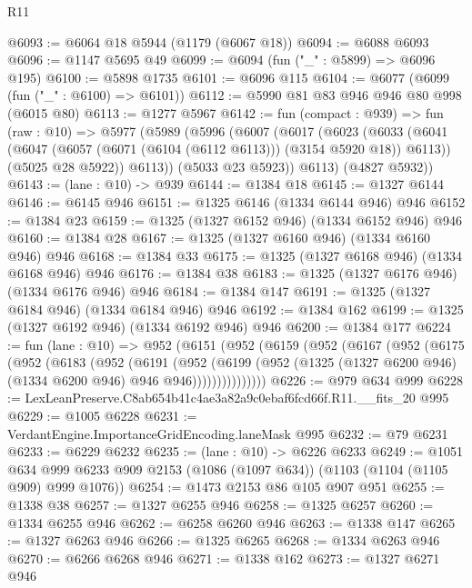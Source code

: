 \begin{lexlean}{R11}
\begin{coremodule}
@6093 := @6064 @18 @5944 (@1179 (@6067 @18))
@6094 := @6088 @6093
@6096 := @1147 @5695 @49
@6099 := @6094 (fun ("_" : @5899) => @6096 @195)
@6100 := @5898 @1735
@6101 := @6096 @115
@6104 := @6077 (@6099 (fun ("_" : @6100) => @6101))
@6112 := @5990 @81 @83 @946 @946 @80 @998 (@6015 @80)
@6113 := @1277 @5967
@6142 := fun (compact : @939) =>
  fun (raw : @10) =>
  @5977
    (@5989
      (@5996
        (@6007
          (@6017
            (@6023
              (@6033
                (@6041 (@6047 (@6057 (@6071 (@6104 (@6112 @6113))) (@3154 @5920 @18)) @6113))
                (@5025 @28 @5922))
              @6113))
          (@5033 @23 @5923))
        @6113)
      (@4827 @5932))
@6143 := (lane : @10) -> @939
@6144 := @1384 @18
@6145 := @1327 @6144
@6146 := @6145 @946
@6151 := @1325 @6146 (@1334 @6144 @946) @946
@6152 := @1384 @23
@6159 := @1325 (@1327 @6152 @946) (@1334 @6152 @946) @946
@6160 := @1384 @28
@6167 := @1325 (@1327 @6160 @946) (@1334 @6160 @946) @946
@6168 := @1384 @33
@6175 := @1325 (@1327 @6168 @946) (@1334 @6168 @946) @946
@6176 := @1384 @38
@6183 := @1325 (@1327 @6176 @946) (@1334 @6176 @946) @946
@6184 := @1384 @147
@6191 := @1325 (@1327 @6184 @946) (@1334 @6184 @946) @946
@6192 := @1384 @162
@6199 := @1325 (@1327 @6192 @946) (@1334 @6192 @946) @946
@6200 := @1384 @177
@6224 := fun (lane : @10) =>
  @952
    (@6151
      (@952
        (@6159
          (@952
            (@6167
              (@952
                (@6175
                  (@952
                    (@6183
                      (@952
                        (@6191
                          (@952
                            (@6199
                              (@952
                                (@1325
                                  (@1327 @6200 @946)
                                  (@1334 @6200 @946)
                                  @946
                                  @946)))))))))))))))
@6226 := @979 @634 @999
@6228 := LexLeanPreserve.C8ab654b41c4ae3a82a9c0ebaf6fcd66f.R11.__fits_20 @995
@6229 := @1005 @6228
@6231 := VerdantEngine.ImportanceGridEncoding.laneMask @995
@6232 := @79 @6231
@6233 := @6229 @6232
@6235 := (lane : @10) -> @6226 @6233
@6249 := @1051
    @634
    @999
    @6233
    @909
    @2153
    (@1086 (@1097 @634))
    (@1103 (@1104 (@1105 @909) @999 @1076))
@6254 := @1473 @2153 @86 @105 @907 @951
@6255 := @1338 @38
@6257 := @1327 @6255 @946
@6258 := @1325 @6257
@6260 := @1334 @6255 @946
@6262 := @6258 @6260 @946
@6263 := @1338 @147
@6265 := @1327 @6263 @946
@6266 := @1325 @6265
@6268 := @1334 @6263 @946
@6270 := @6266 @6268 @946
@6271 := @1338 @162
@6273 := @1327 @6271 @946

\end{coremodule}
\end{lexlean}
